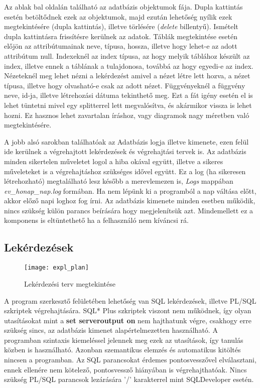 Az ablak bal oldalán található az adatbázis objektumok fája. Dupla kattintás esetén betöltődnek ezek az objektumok, majd ezután lehetőség nyílik ezek megtekintésére
(dupla kattintás), illetve törlésére (\textit{delete} billentyű). Ismételt dupla kattintásra frissítésre kerülnek az adatok. Táblák megtekintése esetén előjön az
attribútumainak neve, típusa, hossza, illetve hogy lehet-e az adott attribútum null. Indexeknél az index típusa, az hogy melyik táblához készült az index, illetve
ennek a táblának a tulajdonosa, továbbá az hogy egyedi-e az index. Nézeteknél meg lehet nézni a lekérdezést amivel a nézet létre lett hozva, a nézet típusa, illetve
hogy olvasható-e csak az adott nézet. Függvényeknél a függvény neve, id-ja, illetve létrehozási dátuma tekinthető meg. Ezt a fát igény esetén el is lehet tüntetni
mivel egy splitterrel lett megvalósítva, és akármikor vissza is lehet hozni. Ez hasznos lehet zavartalan íráshoz, vagy diagramok nagy méretben való megtekintésére.

A jobb alsó sarokban találhatóak az Adatbázis logja illetve kimenete, ezen felül ide kerülnek a végrehajtott lekérdezések és végrehajtási tervek is. Az adatbázis minden
sikertelen műveletet logol a hiba okával együtt, illetve a sikeres műveleteket is a végrehajtáshoz szükséges idővel együtt. Ez a log (ha sikeresen létrehozható) megtalálható
lesz később a merevlemezen is, \textit{Logs} mappában \textit{ev\_honap\_nap.log} formában. Ha nem lépünk ki a programból a nap váltása előtt, akkor előző napi loghoz fog írni. Az adatbázis
kimenete minden esetben működik, nincs szükség külön parancs beírására hogy megjelenítsük azt. Mindemellett ez a komponens is eltüntethető ha a felhasználó nem kíváncsi rá.

\subsection{Lekérdezések}

\begin{figure}[ht]
  \begin{center}
  \texttt{[image: expl\_plan]}
  \end{center}
 \caption{Lekérdezési terv megtekintése}
\end{figure}

A program szerkesztő felületében lehetőség van SQL lekérdezések, illetve PL/SQL szkriptek végrehajtására. SQL* Plus szkriptek viszont
nem működnek, így olyan utasításokat mint a \textbf{set serveroutput on} nem hajthatunk végre, csakhogy erre szükség sincs, az adatbázis kimenet alapértelmezetten
használható. A programban szintaxis kiemeléssel jelennek meg ezek az utasítások, így tanulás közben is használható. Azonban szemantikus elemzés és automatikus
kitöltés nincsen a programban. Az SQL parancsokat érdemes pontosvesszővel elválasztani, ennek ellenére nem kötelező, pontosvessző hiányában is végrehajthatóak.
Nincs szükség PL/SQL parancsok lezárására '/' karakterrel mint SQLDeveloper esetén.

